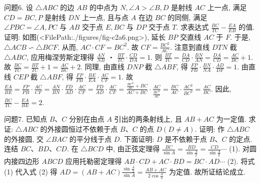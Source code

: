 问题6. 设 $\triangle A B C$ 的边 $A B$ 的中点为 $N, \angle A>\angle B, D$ 是射线 $A C$ 上一点, 满足 $C D=B C, P$ 是射线 $D N$ 上一点, 且与点 $A$ 在边 $B C$ 的同侧, 满足
$\angle P B C=\angle A, P C$ 与 $A B$ 交于点 $E, B C$ 与 $D P$ 交于点 $T$. 求表达式 $\frac{B C}{T C}- \frac{E A}{E B}$ 的值.
证明: 如图(<FilePath:./figures/fig-c2a6.png>), 延长 $B P$ 交直线 $A C$ 于 $F$. 于是, $\triangle A C B \backsim \triangle B C F$. 从而, $A C \cdot C F=B C^2$. 故 $C F=\frac{B C^2}{A C}$. 注意到直线 $D T N$ 截 $\triangle A B C$, 应用梅涅劳斯定理得 $\frac{A N}{N B}$ ・ $\frac{B T}{T C} \cdot \frac{C D}{D A}=1$. 则 $\frac{B T}{T C}=\frac{D A}{C D} \cdot \frac{B N}{A N}=\frac{D A}{C D}=\frac{A C}{B C}+1$. 故 $\frac{B C}{T C}=\frac{B T}{T C}+1=\frac{A C}{B C}+2$. 同理, 由直线 $D N P$ 截 $\triangle A B F$, 得 $\frac{F P}{P B} \cdot \frac{B N}{N A} \cdot \frac{A D}{D F}=1$. 由直线 $C E P$ 截 $\triangle A B F$, 得 $\frac{F P}{P B} \cdot\frac{B E}{E A} \cdot \frac{A C}{C F}=1$. 故 $\frac{E A}{B E}=\frac{F P}{P B} \cdot \frac{A C}{C F}=\frac{A N}{B N} \cdot \frac{F D}{A D} \cdot \frac{A C}{C F}= \frac{F D}{A D} \cdot \frac{A C}{C F}=\frac{\frac{B C^2}{A C}+B C}{A C+B C} \cdot \frac{A C}{\frac{B C^2}{A C}}=\frac{B C}{A C} \cdot \frac{A C^2}{B C^2}=\frac{A C}{B C}$. 因此, $\frac{B C}{T C}-\frac{E A}{B E}=2$.



问题7. 已知点 $B 、 C$ 分别在由点 $A$ 引出的两条射线上, 且 $A B+A C$ 为一定值.
求证: $\triangle A B C$ 的外接圆恒过不依赖于点 $B 、 C$ 的点 $D(D \neq A)$.
证明: 作 $\triangle A B C$ 的外接圆, 交 $\angle B A C$ 的平分线于点 $D$. 下面证明: $D$ 是不依赖于点 $B 、 C$ 的定点.
连结 $B C 、 B D 、 C D$. 在 $\triangle B C D$ 中, 由正弦定理得
$\frac{B C}{\sin A}=\frac{B D}{\sin \frac{A}{2}}=\frac{C D}{\sin \frac{A}{2}} \cdots$ (1). 对圆内接四边形 $A B C D$ 应用托勒密定理得 $A B \cdot C D+A C \cdot B D=B C \cdot A D \cdots$ (2). 将式 (1) 代入式 (2) 得 $A D=(A B+A C) \frac{\sin \frac{A}{2}}{\sin A}=\frac{A B+A C}{2 \cos \frac{A}{2}}$ 为定值.
故所证结论成立.



